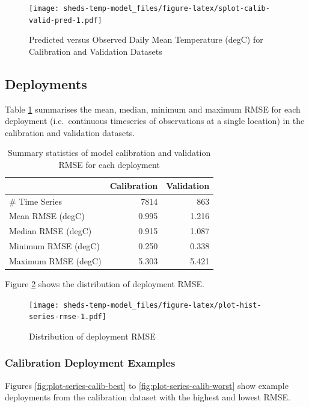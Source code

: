 \documentclass[
]{book}
\begin{document}
\begin{figure}
\centering
\texttt{[image: sheds-temp-model\_files/figure-latex/splot-calib-valid-pred-1.pdf]}
\caption{\label{fig:splot-calib-valid-pred}Predicted versus Observed Daily Mean Temperature (degC) for Calibration and Validation Datasets}
\end{figure}

\subsection{Deployments}\label{deployments}

Table \ref{tab:table-gof-series} summarises the mean, median, minimum and maximum RMSE for each deployment (i.e.~continuous timeseries of observations at a single location) in the calibration and validation datasets.

\begin{table}

\caption{\label{tab:table-gof-series}Summary statistics of model calibration and validation RMSE for each deployment}
\centering
\begin{tabular}[t]{l|r|r}
\hline
 & Calibration & Validation\\
\hline
\# Time Series & 7814 & 863\\
\hline
Mean RMSE (degC) & 0.995 & 1.216\\
\hline
Median RMSE (degC) & 0.915 & 1.087\\
\hline
Minimum RMSE (degC) & 0.250 & 0.338\\
\hline
Maximum RMSE (degC) & 5.303 & 5.421\\
\hline
\end{tabular}
\end{table}

Figure \ref{fig:plot-hist-series-rmse} shows the distribution of deployment RMSE.

\begin{figure}
\centering
\texttt{[image: sheds-temp-model\_files/figure-latex/plot-hist-series-rmse-1.pdf]}
\caption{\label{fig:plot-hist-series-rmse}Distribution of deployment RMSE}
\end{figure}

\subsubsection{Calibration Deployment Examples}\label{calibration-deployment-examples}

Figures \ref{fig:plot-series-calib-best} to \ref{fig:plot-series-calib-worst} show example deployments from the calibration dataset with the highest and lowest RMSE.
\end{document}
